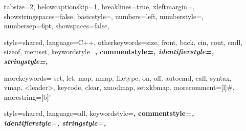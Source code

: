  {
  tabsize=2,
  belowcaptionskip=1\baselineskip,
  breaklines=true,
  xleftmargin=\parindent,
  showstringspaces=false,
  basicstyle=\fontsize{5.5}{6}\ttfamily,
  numbers=left,
  numberstyle=\tiny\color{black},
  numbersep=6pt,
  showspaces=false,
}

 {
  style=shared,
  language=C++,
  otherkeywords={size, front, back, cin, cout, endl, sizeof, memset},
  keywordstyle=\bfseries\color{Blue},
  commentstyle=\itshape\color{RoyalPurple},
  identifierstyle=\color{Black},
  stringstyle=\color{OliveGreen},
}

 {
  morekeywords={ set, let, map, nmap, filetype, on, off, autocmd, call, syntax, vmap, <leader>, keycode, clear, xmodmap, setxkbmap},
  morecomment=[l]{\#}, %
  morestring=[b]' %
}

 {
  style=shared,
  language=all,
  keywordstyle=\bfseries\color{PineGreen},
  commentstyle=\itshape\color{JungleGreen},
  identifierstyle=\color{Orchid},
  stringstyle=\color{OliveGreen},
}

\lstset{escapechar=@}

\pagestyle{fancy}
\fancyhead[R]{\thepage}
\fancyfoot[C]{}

 {
  \fancyhead[R]{\thepage}
  \fancyfoot[C]{}
}

